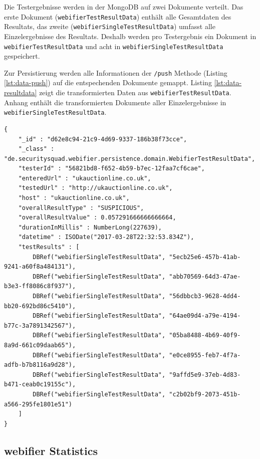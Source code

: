 Die Testergebnisse werden in der MongoDB auf zwei Dokumente verteilt. Das erste Dokument (\lstinline[style=eclipse]{webifierTestResultData}) enthält alle Gesamtdaten des Resultats, das zweite (\lstinline[style=eclipse]{webifierSingleTestResultData}) umfasst alle Einzelergebnisse des Resultats. Deshalb werden pro Testergebnis ein Dokument in \lstinline[style=eclipse]{webifierTestResultData} und acht in \lstinline[style=eclipse]{webifierSingleTestResultData} gespeichert.

Zur Persistierung werden alle Informationen der \lstinline[style=eclipse]{/push} Methode (Listing \ref{lst:data-push}) auf die entspechenden Dokumente gemappt. Listing \ref{lst:data-resultdata} zeigt die transformierten Daten aus \lstinline[style=eclipse]{webifierTestResultData}. Anhang  enthält die transformierten Dokumente aller Einzelergebnisse in \lstinline[style=eclipse]{webifierSingleTestResultData}.

\begin{scriptsize}
\begin{lstlisting}
{
	"_id" : "d62e8c94-21c9-4d69-9337-186b38f73cce",
	"_class" : "de.securitysquad.webifier.persistence.domain.WebifierTestResultData",
	"testerId" : "56821bd8-f652-4b59-b7ec-12faa7cf6cae",
	"enteredUrl" : "ukauctionline.co.uk",
	"testedUrl" : "http://ukauctionline.co.uk",
	"host" : "ukauctionline.co.uk",
	"overallResultType" : "SUSPICIOUS",
	"overallResultValue" : 0.057291666666666664,
	"durationInMillis" : NumberLong(227639),
	"datetime" : ISODate("2017-03-28T22:32:53.834Z"),
	"testResults" : [
		DBRef("webifierSingleTestResultData", "5ecb25e6-457b-41ab-9241-a60f8a484131"),
		DBRef("webifierSingleTestResultData", "abb70569-64d3-47ae-b3e3-ff8086c8f937"),
		DBRef("webifierSingleTestResultData", "56dbbcb3-9628-4dd4-bb20-692bd86c5410"),
		DBRef("webifierSingleTestResultData", "64ae09d4-a79e-4194-b77c-3a7891342567"),
		DBRef("webifierSingleTestResultData", "05ba8488-4b69-40f9-8a9d-661c09daab65"),
		DBRef("webifierSingleTestResultData", "e0ce8955-feb7-4f7a-adfb-b7b8116a9d28"),
		DBRef("webifierSingleTestResultData", "9affd5e9-37eb-4d83-b471-ceab0c19155c"),
		DBRef("webifierSingleTestResultData", "c2b02bf9-2073-451b-a566-295fe1801e51")
	]
}
\end{lstlisting}
\end{scriptsize}

\subsection{webifier Statistics}
\label{sec:umsetzung-statistics}

